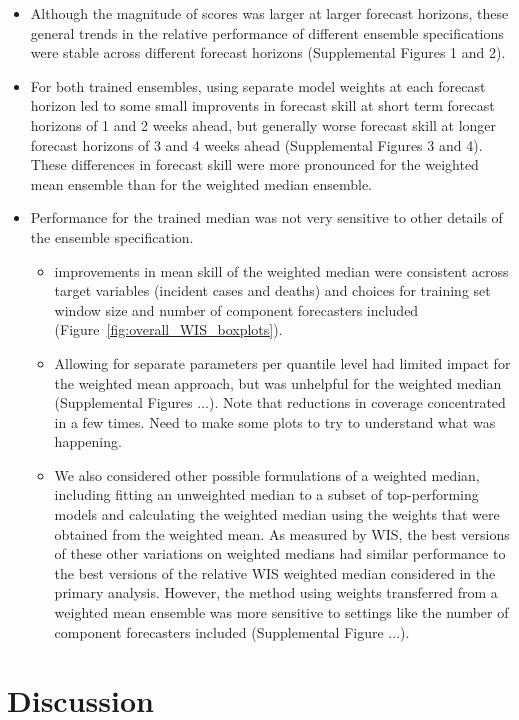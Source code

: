 \documentclass[review]{elsarticle}
\begin{document}
\begin{itemize}
\begin{itemize}
\begin{itemize}
    \end{itemize}
  \end{itemize}
  \item Although the magnitude of scores was larger at larger forecast horizons, these general trends in the relative performance of different ensemble specifications were stable across different forecast horizons (Supplemental Figures 1 and 2).
  \item For both trained ensembles, using separate model weights at each forecast horizon led to some small improvents in forecast skill at short term forecast horizons of 1 and 2 weeks ahead, but generally worse forecast skill at longer forecast horizons of 3 and 4 weeks ahead (Supplemental Figures 3 and 4).  These differences in forecast skill were more pronounced for the weighted mean ensemble than for the weighted median ensemble.
  \item Performance for the trained median was not very sensitive to other details of the ensemble specification.
  \begin{itemize}
    \item improvements in mean skill of the weighted median were consistent across target variables (incident cases and deaths) and choices for training set window size and number of component forecasters included (Figure~\ref{fig:overall_WIS_boxplots}).
    \item Allowing for separate parameters per quantile level had limited impact for the weighted mean approach, but was unhelpful for the weighted median (Supplemental Figures ...).  Note that reductions in coverage concentrated in a few times. Need to make some plots to try to understand what was happening.
    \item We also considered other possible formulations of a weighted median, including fitting an unweighted median to a subset of top-performing models and calculating the weighted median using the weights that were obtained from the weighted mean.  As measured by WIS, the best versions of these other variations on weighted medians had similar performance to the best versions of the relative WIS weighted median considered in the primary analysis.  However, the method using weights transferred from a weighted mean ensemble was more sensitive to settings like the number of component forecasters included (Supplemental Figure ...).
  \end{itemize}
\end{itemize}

\section{Discussion}
\end{document}

